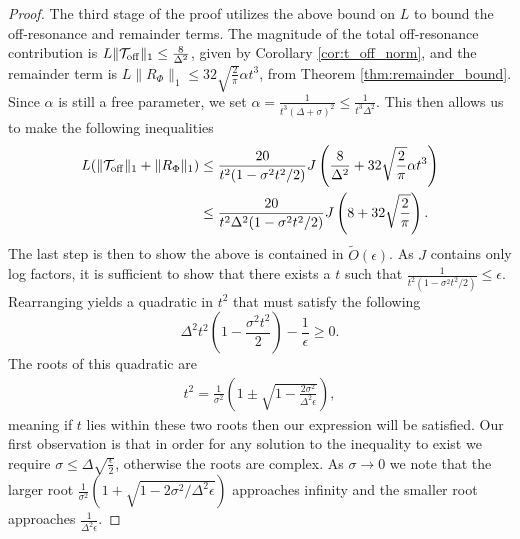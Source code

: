 \documentclass{article}
\newcommand{\off}{\rm off}
\newcommand{\norm}[1]{\| #1 \|}
\newcommand{\bigotilde}[1]{\widetilde{O} \left( #1 \right)}
\begin{document}
\begin{proof}
 The third stage of the proof utilizes the above bound on $L$ to bound the  off-resonance and remainder terms. The magnitude of the total off-resonance contribution is $L \norm{\mathcal{T}_{\off}}_1 \le \frac{8 }{\Delta^2}$, given by Corollary \ref{cor:t_off_norm}, and the remainder term is $L \norm{R_{\Phi}}_1 \le 32 \sqrt{\frac{2}{\pi}} \alpha t^3$, from Theorem \ref{thm:remainder_bound}. %
 Since $\alpha$ is still a free parameter, we %
 set $\alpha = \frac{1}{t^3(\Delta + \sigma)^2} \le \frac{1}{t^3 \Delta^2}$. This then allows us to make the following inequalities
 \begin{align}
     L(\norm{\mathcal{T}_{\off}}_1 + \norm{R_{\Phi}}_1) &\le \frac{20}{t^2(1 - \sigma^2 t^2 / 2)}J \left( \frac{8}{\Delta^2} + 32 \sqrt{\frac{2}{\pi}} \alpha t^3 \right) \\
    &\le \frac{20}{t^2 \Delta^2 (1 - \sigma^2 t^2 / 2)}J \left( 8 + 32 \sqrt{\frac{2}{\pi}}\right). \label{eq:single_qubit_tmp_2}
 \end{align}
The last step is then to show the above is contained in $\bigotilde{\epsilon}$. As $J$ contains only log factors, it is sufficient to show that there exists a $t$ such that $\frac{1}{t^2(1 - \sigma^2 t^2 / 2)} \le \epsilon$. Rearranging yields a quadratic in $t^2$ that must satisfy the following
\begin{equation}
    \Delta^2 t^2 \left(1 - \frac{\sigma^2 t^2}{2}\right) - \frac{1}{\epsilon} \ge 0. \label{eq:single_qubit_tmp_3}
\end{equation}
The roots of this quadratic are
\begin{align}
    t^2 = \frac{1}{\sigma^2}\left(1 \pm \sqrt{1 - \frac{2 \sigma^2}{\Delta^2 \epsilon}} \right),
\end{align}
meaning if $t$ lies within these two roots then our expression will be satisfied. Our first observation is that in order for any solution to the inequality to exist we require $\sigma \le \Delta \sqrt{\frac{\epsilon}{2}}$, otherwise the roots are complex. As $\sigma \to 0$ we note that the larger root $\frac{1}{\sigma^2}(1 + \sqrt{1 - 2 \sigma^2 / \Delta^2 \epsilon})$ approaches infinity and the smaller root approaches $\frac{1}{\Delta^2 \epsilon}$.


\end{proof}
\end{document}
